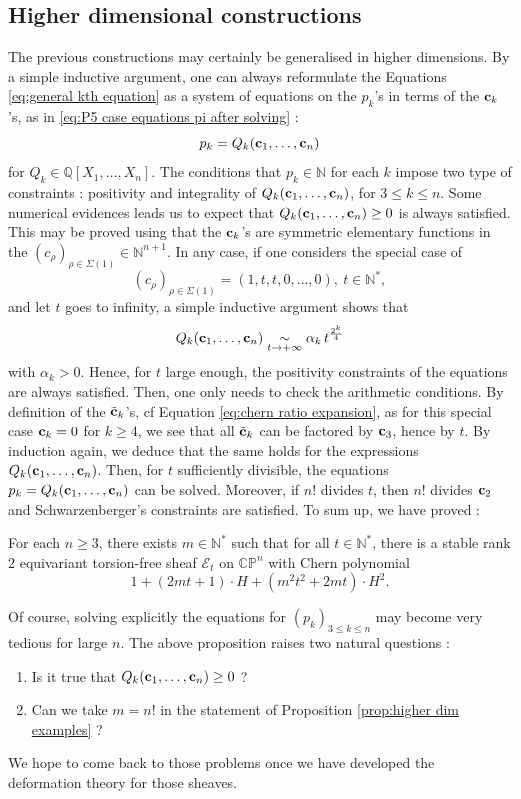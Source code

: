 \documentclass[a4paper,10pt]{amsart}
\theoremstyle{plain}{
    \newtheorem{theorem}{Theorem}[section]
    \newtheorem{lemma}[theorem]{Lemma}
    \newtheorem{corollary}[theorem]{Corollary}
    \newtheorem{proposition}[theorem]{Proposition}
    \newtheorem{conjecture}[theorem]{Conjecture}
}
\theoremstyle{definition}{
    \newtheorem{definition}[theorem]{Definition}
    \newtheorem{defn-thm}[theorem]{Definition-Theorem}
    \newtheorem{example}[theorem]{Example}
    \newtheorem{notation}[theorem]{Notation}
}
\theoremstyle{remark}{
    \newtheorem{remark}[theorem]{Remark}
    \newtheorem{problem}[theorem]{Problem}
    \newtheorem{question}[theorem]{Question}
}
\def\uc{{\bf c}}
\def\cE{\mathcal{E}}
\def\Q{\mathbb{Q}}
\def\N{\mathbb{N}}
\def\P{\mathbb{P}}
\def\C{\mathbb{C}}
\begin{document}
\subsection{Higher dimensional constructions}
\label{sec:Pn}

The previous constructions may certainly be generalised in higher dimensions. By a simple inductive argument, one can always reformulate the Equations \eqref{eq:general kth equation} as a system of equations on the $p_k$'s in terms of the $\uc_k$'s, as in \eqref{eq:P5 case equations pi after solving} :
$$
p_k=Q_k(\uc_1,\ldots,\uc_n)
$$
for $Q_k\in\Q[X_1,\ldots,X_n]$. The conditions that $p_k\in\N$ for each $k$ impose two type of constraints : positivity and integrality of $Q_k(\uc_1,\ldots,\uc_n)$, for $3\leq k \leq n$. Some numerical evidences leads us to expect that $Q_k(\uc_1,\ldots,\uc_n)\geq 0$ is always satisfied. This may be proved using that the $\uc_k$'s are symmetric elementary functions in the $(c_\rho)_{\rho\in\Sigma(1)}\in\N^{n+1}$. In any case, if one considers the special case of
$$
(c_\rho)_{\rho\in\Sigma(1)}=(1,t,t,0,\ldots,0),\: t\in\N^*,
$$
and let $t$ goes to infinity, a simple inductive argument shows that 
$$
Q_k(\uc_1,\ldots,\uc_n)\underset{t\to +\infty}{\sim}\alpha_k\, t^{\frac{2^k}{4}}
$$ with $\alpha_k >0$. Hence, for $t$ large enough, the positivity constraints of the equations are always satisfied. Then, one only needs to check the arithmetic conditions. By definition of the $\tilde \uc_k$'s, cf Equation \eqref{eq:chern ratio expansion}, as for this special case $\uc_k=0$ for $k\geq 4$, we see that all $\tilde \uc_k$ can be factored by $\uc_3$, hence by $t$. By induction again, we deduce that the same holds for the expressions $Q_k(\uc_1,\ldots,\uc_n)$. Then, for $t$ sufficiently divisible, the equations $p_k=Q_k(\uc_1,\ldots,\uc_n)$ can be solved. Moreover, if $n!$ divides $t$, then $n!$ divides $\uc_2$ and Schwarzenberger's constraints are satisfied. To sum up, we have proved :
\begin{proposition}
 \label{prop:higher dim examples}
 For each $n\geq 3$, there exists $m\in\N^*$ such that for all $t\in\N^*$, there is a stable rank $2$ equivariant torsion-free sheaf $\cE_t$ on $\C\P^n$ with Chern polynomial
 $$
 1+(2mt+1)\cdot H+(m^2t^2+2mt)\cdot H^2.
 $$
\end{proposition}
Of course, solving explicitly the equations for $(p_k)_{3\leq k\leq n}$ may become very tedious for large $n$. The above proposition raises two natural questions :
\begin{enumerate}
 \item Is it true that $Q_k(\uc_1,\ldots,\uc_n)\geq 0$ ?
 \item Can we take $m=n!$ in the statement of Proposition \ref{prop:higher dim examples} ?
\end{enumerate}
We hope to come back to those problems once we have developed the deformation theory for those sheaves.
\end{document}

